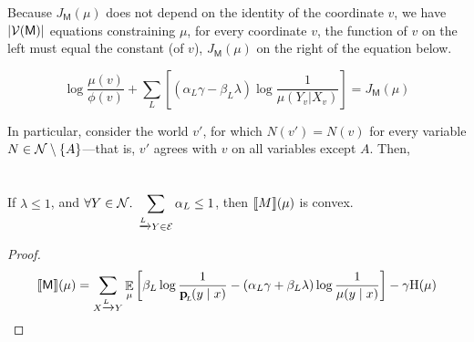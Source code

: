 \documentclass{article}
\newcommand{\sfM}{\mathsf M}
\begin{document}
	
	Because $J_\sfM(\mu)$ does not depend on the identity of the coordinate $v$, we have $|\V(\sfM)|$ equations constraining $\mu$, for every coordinate $v$, the function of $v$ on the left must equal the constant (of $v$), $J_\sfM(\mu)$ on the right of the equation below.
		
	\[  \log\frac{\mu(v)}{\phi(v)} + \sum_L\left[ (\alpha_L \gamma - \beta_L \lambda ) \log \frac{1}{\mu(Y_v | X_v)} \right] = J_\sfM(\mu) \]
	
	In particular, consider the world $v'$, for which $N(v') = N(v)$ for every variable $N \in \mathcal N \setminus \{A\}$---that is, $v'$ agrees with $v$ on all variables except $A$. Then,
	
	\section{}
	\begin{prop}
		If $\lambda \leq 1$, and
		$\displaystyle \forall Y \in \mathcal N. ~\sum_{ \xrightarrow{\!\!L} Y  \in \mathcal E } \alpha_L\leq 1$, then
		$\llbracket M\rrbracket(\mu)$ is convex.
	\end{prop}
	\begin{proof}
		\begin{align*}
			\bbr{\sfM}(\mu) &= \sum_{ X \xrightarrow{\!\!L} Y} \E_\mu  \left[
			\beta_L \log \frac{1}{\bp(y\mid x)} - (\alpha_L\gamma + \beta_L \lambda) \log \frac{1}{\mu(y \mid x)} \right] - \gamma \H(\mu) \\
		\end{align*}
		
	\end{proof}
	
	

	
\end{document}
